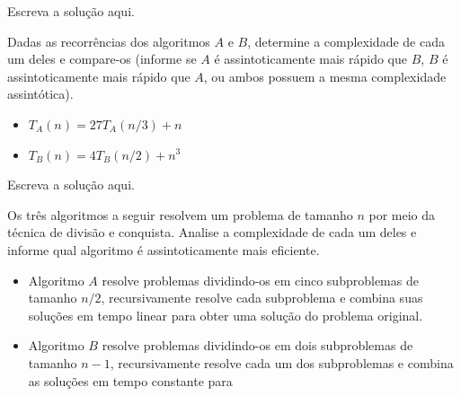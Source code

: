 \documentclass[a4paper]{exam}
\begin{document}
\begin{questions}
  \begin{solution}
    Escreva a solução aqui.
  \end{solution}
  \question Dadas as recorrências dos algoritmos $A$ e
  $B$, determine a complexidade de cada um deles e compare-os
  (informe se $A$ é assintoticamente mais rápido que $B$, $B$
  é assintoticamente mais rápido que $A$, ou ambos possuem a
  mesma complexidade assintótica).
  \begin{itemize}
  \item $T_A(n) = 27T_A(n/3) + n$
  \item $T_B(n) = 4T_B(n/2) + n^3$
  \end{itemize}
  \begin{solution}
    Escreva a solução aqui.
  \end{solution}
  \question Os três algoritmos a seguir resolvem um
  problema de tamanho $n$ por meio da técnica de divisão e conquista.
  Analise a complexidade de cada um deles e informe qual algoritmo é
  assintoticamente mais eficiente.
  \begin{itemize}
  \item Algoritmo $A$ resolve problemas dividindo-os em cinco
    subproblemas de tamanho $n/2$, recursivamente resolve cada
    subproblema e combina suas soluções em tempo linear para obter
    uma solução do problema original.
    \item Algoritmo $B$ resolve problemas dividindo-os em dois
      subproblemas de tamanho $n-1$, recursivamente resolve cada um
      dos subproblemas e combina as soluções em tempo constante para

\end{itemize}
\end{questions}
\end{document}
